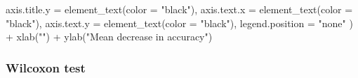\documentclass[
  11pt,
  oneside]{book}
\newenvironment{Shaded}{\begin{snugshade}}{\end{snugshade}}
\newcommand{\AttributeTok}[1]{\textcolor[rgb]{0.77,0.63,0.00}{#1}}
\newcommand{\FunctionTok}[1]{\textcolor[rgb]{0.00,0.00,0.00}{#1}}
\newcommand{\NormalTok}[1]{#1}
\newcommand{\SpecialCharTok}[1]{\textcolor[rgb]{0.00,0.00,0.00}{#1}}
\newcommand{\StringTok}[1]{\textcolor[rgb]{0.31,0.60,0.02}{#1}}
\begin{document}
\begin{Shaded}
\begin{Highlighting}[]
    \AttributeTok{axis.title.y =} \FunctionTok{element\_text}\NormalTok{(}\AttributeTok{color =} \StringTok{"black"}\NormalTok{),}
    \AttributeTok{axis.text.x =} \FunctionTok{element\_text}\NormalTok{(}\AttributeTok{color =} \StringTok{"black"}\NormalTok{),}
    \AttributeTok{axis.text.y =} \FunctionTok{element\_text}\NormalTok{(}\AttributeTok{color =} \StringTok{"black"}\NormalTok{),}
    \AttributeTok{legend.position =} \StringTok{"none"}
\NormalTok{  ) }\SpecialCharTok{+}
  \FunctionTok{xlab}\NormalTok{(}\StringTok{""}\NormalTok{) }\SpecialCharTok{+}
  \FunctionTok{ylab}\NormalTok{(}\StringTok{"Mean decrease in accuracy"}\NormalTok{)}
\end{Highlighting}
\end{Shaded}

\hypertarget{wilcoxon-test-1}{%
\subsubsection{Wilcoxon test}\label{wilcoxon-test-1}}
\end{document}
